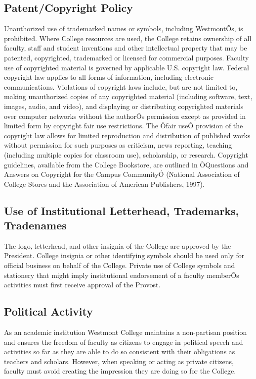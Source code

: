 \documentclass[letterpaper, 11pt]{article}
\begin{document}
	\subsection{Patent/Copyright Policy}
		Unauthorized use of trademarked names or symbols, including WestmontÕs, is prohibited.  Where College resources are used, the College retains ownership of all faculty, staff and student inventions and other intellectual property that may be patented, copyrighted, trademarked or licensed for commercial purposes.
		Faculty use of copyrighted material is governed by applicable U.S. copyright law.  Federal copyright law applies to all forms of information, including electronic communications.  Violations of copyright laws include, but are not limited to, making unauthorized copies of any copyrighted material (including software, text, images, audio, and video), and displaying or distributing copyrighted materials over computer networks without the authorÕs permission except as provided in limited form by copyright fair use restrictions.  The Òfair useÓ provision of the copyright law allows for limited reproduction and distribution of published works without permission for such purposes as criticism, news reporting, teaching (including multiple copies for classroom use), scholarship, or research.  Copyright guidelines, available from the College Bookstore, are outlined in ÒQuestions and Answers on Copyright for the Campus CommunityÓ (National Association of College Stores and the Association of American Publishers, 1997).
	\subsection{Use of Institutional Letterhead, Trademarks, Tradenames}
		The logo, letterhead, and other insignia of the College are approved by the President.  College insignia or other identifying symbols should be used only for official business on behalf of the College.  Private use of College symbols and stationery that might imply institutional endorsement of a faculty memberÕs activities must first receive approval of the Provost.
	\subsection{Political Activity}
		As an academic institution Westmont College maintains a non-partisan position and ensures the freedom of faculty as citizens to engage in political speech and activities so far as they are able to do so consistent with their obligations as teachers and scholars.  However, when speaking or acting as private citizens, faculty must avoid creating the impression they are doing so for the College.
\end{document}
